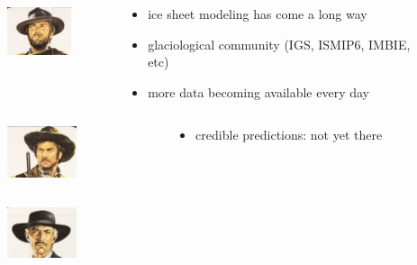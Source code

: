 \documentclass[hide notes,intlimits]{beamer}
\begin{document}
\begin{frame}[label=leone]
  \begin{columns}[c]
    \begin{column}{.2\linewidth}
      \begin{figure}
        \includegraphics[height=1.5cm]{thegood}
      \end{figure}
    \end{column}
    \begin{column}{.7\linewidth}
      \begin{itemize}
      \item ice sheet modeling has come a long way
      \item glaciological community (IGS, ISMIP6, IMBIE, etc)
      \item more data becoming available every day
      \end{itemize}
    \end{column}
  \end{columns}
  \vspace{2em}
  \begin{columns}[c]
    \begin{column}{.2\linewidth}
      \begin{figure}
        \includegraphics[height=1.5cm]{thebad}
      \end{figure}
    \end{column}
    \begin{column}{.7\linewidth}
      \begin{itemize}
      \item credible predictions: not yet there
      \end{itemize}
    \end{column}
  \end{columns}
  \vspace{2em}
  \begin{columns}[c]
    \begin{column}{.2\linewidth}
      \begin{figure}
        \includegraphics[height=1.5cm]{theugly}

\end{figure}
\end{column}
\end{columns}
\end{frame}
\end{document}
